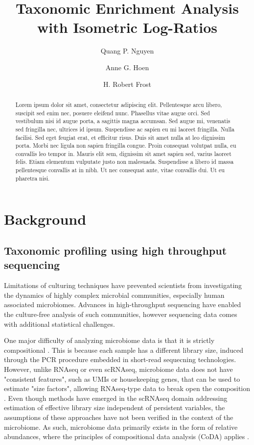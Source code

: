 \documentclass{article}
\title{Taxonomic Enrichment Analysis with Isometric Log-Ratios}
\author[1,2]{Quang P. Nguyen}
\author[1,2]{Anne G. Hoen}
\author[1]{H. Robert Frost}
\affil[1]{Department of Biomedical Data Science, Geisel School of Medicine at Dartmouth College, Hanover, NH 03755, USA}
\affil[2]{Department of Epidemiology, Geisel School of Medicine at Dartmouth College, Hanover, NH 03755, USA}
\date{}                     %
\begin{document}
\maketitle

\begin{abstract}
    Lorem ipsum dolor sit amet, consectetur adipiscing elit. Pellentesque arcu libero, suscipit sed enim nec, posuere eleifend nunc. Phasellus vitae augue orci. Sed vestibulum nisi id augue porta, a sagittis magna accumsan. Sed augue mi, venenatis sed fringilla nec, ultrices id ipsum. Suspendisse ac sapien eu mi laoreet fringilla. Nulla facilisi. Sed eget feugiat erat, et efficitur risus. Duis sit amet nulla at leo dignissim porta. Morbi nec ligula non sapien fringilla congue. Proin consequat volutpat nulla, eu convallis leo tempor in. Mauris elit sem, dignissim sit amet sapien sed, varius laoreet felis. Etiam elementum vulputate justo non malesuada. Suspendisse a libero id massa pellentesque convallis at in nibh. Ut nec consequat ante, vitae convallis dui. Ut eu pharetra nisi. 
\end{abstract}

\section*{Background}
\subsection*{Taxonomic profiling using high throughput sequencing}Limitations of culturing techniques have prevented scientists from investigating the dynamics of highly complex microbial communities, especially human associated microbiomes. Advances in high-throughput sequencing have enabled the culture-free analysis of such communities, however sequencing data comes with additional statistical challenges.

One major difficulty of analyzing microbiome data is that it is strictly compositional \cite{gloor2017}. This is because each sample has a different library size, induced through the PCR procedure embedded in short-read sequecning technologies. However, unlike RNAseq or even scRNAseq, microbiome data does not have "consistent features", such as UMIs or housekeeping genes, that can be used to estimate "size factors", allowing RNAseq-type data to break open the composition \cite{quinn2018}. Even though methods have emerged in the scRNAseq domain addressing estimation of effective library size independent of persistent variables, the assumptions of these approaches have not been verified in the context of the microbiome. As such, microbiome data primarily exists in the form of relative abundances, where the principles of compositional data analysis (CoDA) applies \cite{aitchison}. 
\end{document}

